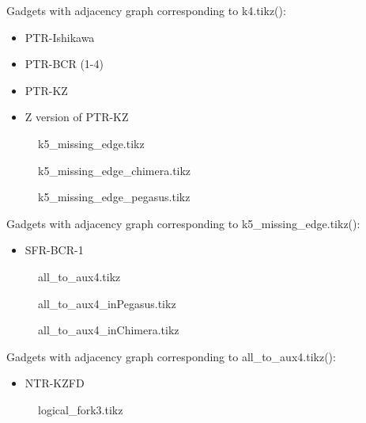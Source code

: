 \documentclass{article}
\begin{document}
Gadgets with adjacency graph corresponding to k4.tikz(\scalebox{.25}{}):

\begin{itemize}
\item PTR-Ishikawa
\item PTR-BCR (1-4)
\item PTR-KZ
\item Z version of PTR-KZ 
\end{itemize}

\begin{figure}

\caption{k5\_missing\_edge.tikz}
\end{figure}

\begin{figure}

\caption{k5\_missing\_edge\_chimera.tikz}
\end{figure}

\begin{figure}

\caption{k5\_missing\_edge\_pegasus.tikz}
\end{figure}


Gadgets with adjacency graph corresponding to k5\_missing\_edge.tikz(\scalebox{.25}{}):

\begin{itemize}
\item SFR-BCR-1
\end{itemize}

\begin{figure}

\caption{all\_to\_aux4.tikz}
\end{figure}

\begin{figure}

\caption{all\_to\_aux4\_inPegasus.tikz}
\end{figure}

\begin{figure}

\caption{all\_to\_aux4\_inChimera.tikz}
\end{figure}

Gadgets with adjacency graph corresponding to all\_to\_aux4.tikz(\scalebox{.25}{}):

\begin{itemize}
\item NTR-KZFD 
\end{itemize}

\begin{figure}

\caption{logical\_fork3.tikz}
\end{figure}
\end{document}
